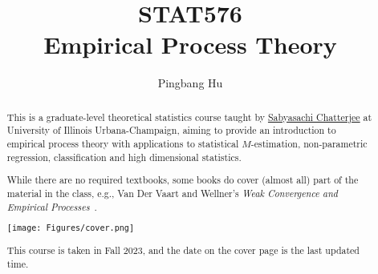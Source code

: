 \documentclass[a4paper]{report}
\author{Pingbang Hu}
\title{STAT576\\Empirical Process Theory}
\begin{document}
\maketitle

\begin{abstract}
	This is a graduate-level theoretical statistics course taught by \href{https://sabyasachi.web.illinois.edu/}{Sabyasachi Chatterjee} at University of Illinois Urbana-Champaign, aiming to provide an introduction to empirical process theory with applications to statistical \(M\)-estimation, non-parametric regression, classification and high dimensional statistics.

	While there are no required textbooks, some books do cover (almost all) part of the material in the class, e.g., Van Der Vaart and Wellner's \emph{Weak Convergence and Empirical Processes}~\cite{vandervaartWeakConvergenceEmpirical1996}.

	\vfill
	\begin{center}
		\texttt{[image: Figures/cover.png]}
	\end{center}
	\vfill
	This course is taken in Fall 2023, and the date on the cover page is the last updated time.
\end{abstract}

\tableofcontents


\newpage
\appendix
\appendixpage{}



\newpage
\printbibliography{}
\end{document}
